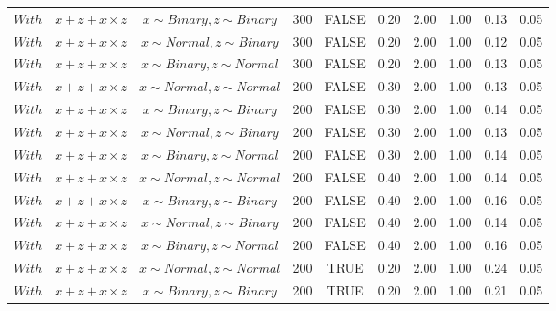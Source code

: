 \begin{longtable}{lccccccccc}
  $With$ & $\textit{x} + \textit{z} + \textit{x} \times \textit{z}$ & $\textit{x} \sim Binary, \textit{z} \sim Binary$ & 300 & FALSE & 0.20 & 2.00 & 1.00 & 0.13 & 0.05 \\ 
  $With$ & $\textit{x} + \textit{z} + \textit{x} \times \textit{z}$ & $\textit{x} \sim Normal, \textit{z} \sim Binary$ & 300 & FALSE & 0.20 & 2.00 & 1.00 & 0.12 & 0.05 \\ 
  $With$ & $\textit{x} + \textit{z} + \textit{x} \times \textit{z}$ & $\textit{x} \sim Binary, \textit{z} \sim Normal$ & 300 & FALSE & 0.20 & 2.00 & 1.00 & 0.13 & 0.05 \\ 
  $With$ & $\textit{x} + \textit{z} + \textit{x} \times \textit{z}$ & $\textit{x} \sim Normal , \textit{z} \sim Normal$ & 200 & FALSE & 0.30 & 2.00 & 1.00 & 0.13 & 0.05 \\ 
  $With$ & $\textit{x} + \textit{z} + \textit{x} \times \textit{z}$ & $\textit{x} \sim Binary, \textit{z} \sim Binary$ & 200 & FALSE & 0.30 & 2.00 & 1.00 & 0.14 & 0.05 \\ 
  $With$ & $\textit{x} + \textit{z} + \textit{x} \times \textit{z}$ & $\textit{x} \sim Normal, \textit{z} \sim Binary$ & 200 & FALSE & 0.30 & 2.00 & 1.00 & 0.13 & 0.05 \\ 
  $With$ & $\textit{x} + \textit{z} + \textit{x} \times \textit{z}$ & $\textit{x} \sim Binary, \textit{z} \sim Normal$ & 200 & FALSE & 0.30 & 2.00 & 1.00 & 0.14 & 0.05 \\ 
  $With$ & $\textit{x} + \textit{z} + \textit{x} \times \textit{z}$ & $\textit{x} \sim Normal , \textit{z} \sim Normal$ & 200 & FALSE & 0.40 & 2.00 & 1.00 & 0.14 & 0.05 \\ 
  $With$ & $\textit{x} + \textit{z} + \textit{x} \times \textit{z}$ & $\textit{x} \sim Binary, \textit{z} \sim Binary$ & 200 & FALSE & 0.40 & 2.00 & 1.00 & 0.16 & 0.05 \\ 
  $With$ & $\textit{x} + \textit{z} + \textit{x} \times \textit{z}$ & $\textit{x} \sim Normal, \textit{z} \sim Binary$ & 200 & FALSE & 0.40 & 2.00 & 1.00 & 0.14 & 0.05 \\ 
  $With$ & $\textit{x} + \textit{z} + \textit{x} \times \textit{z}$ & $\textit{x} \sim Binary, \textit{z} \sim Normal$ & 200 & FALSE & 0.40 & 2.00 & 1.00 & 0.16 & 0.05 \\ 
  $With$ & $\textit{x} + \textit{z} + \textit{x} \times \textit{z}$ & $\textit{x} \sim Normal , \textit{z} \sim Normal$ & 200 & TRUE & 0.20 & 2.00 & 1.00 & 0.24 & 0.05 \\ 
  $With$ & $\textit{x} + \textit{z} + \textit{x} \times \textit{z}$ & $\textit{x} \sim Binary, \textit{z} \sim Binary$ & 200 & TRUE & 0.20 & 2.00 & 1.00 & 0.21 & 0.05 \\ 

\end{longtable}

